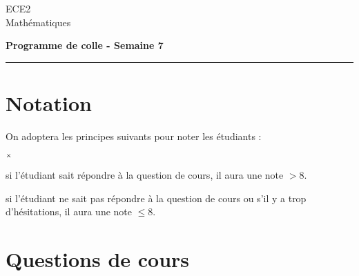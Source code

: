 \documentclass[11pt]{article}%
\begin{document}
\begin{flushleft}
ECE2 \\
Mathématiques
\end{flushleft}


\vspace{0.1cm}

\begin{center}
\textbf{\Large{Programme de colle - Semaine 7}}
\end{center}

\hrule

\vspace*{0,2cm}

\section*{Notation}

\noindent
On adoptera les principes suivants pour noter les étudiants :
\begin{noliste}{$\scriptstyle \times$}
\item si l'étudiant sait répondre à la question de cours, il 
aura une note $>8$.
\item si l'étudiant ne sait pas répondre à la question de 
cours ou s'il y a trop d'hésitations, il aura une note $\leq 8$.
\end{noliste}

\section*{Questions de cours}
\end{document}
